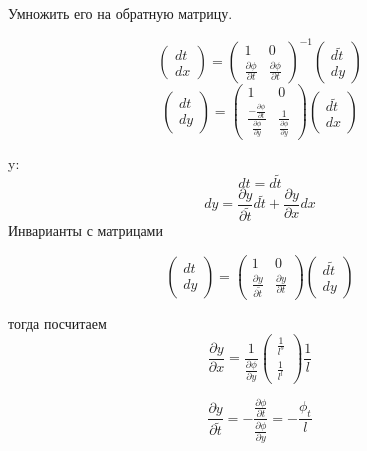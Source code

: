 \documentclass[12pt, a4paper]{article}
\begin{document}
Умножить его на обратную матрицу.

\[
\begin{pmatrix}
	d t \\
	d x
\end{pmatrix}
 =
\begin{pmatrix}
	1 & 0 \\
	\frac{\partial \phi}{\partial t} & \frac{\partial \phi}{\partial t}
\end{pmatrix}^{-1}
\begin{pmatrix}
	d \widetilde{t} \\
	dy
\end{pmatrix}
\]
\[
\begin{pmatrix}
	d t \\
	d y
\end{pmatrix}
 =
\begin{pmatrix}
	1 & 0 \\
	\frac{-\frac{\partial \phi}{\partial t}}{\frac{\partial \phi}{\partial y}} & \frac{1}{\frac{\partial \phi}{\partial y}}
\end{pmatrix}
\begin{pmatrix}
	d \widetilde{t} \\
	dx
\end{pmatrix}
\]

y:
\[ dt = d\widetilde{t} \]
\[ dy = \frac{\partial y}{\partial  \widetilde{t}} d \widetilde{t} + \frac{\partial y}{\partial x} dx \]
Инварианты с матрицами

\[
\begin{pmatrix}
	d t \\
	d y
\end{pmatrix}
 =
\begin{pmatrix}
	1 & 0 \\
	\frac{\partial y}{\partial \widetilde{t}} & \frac{\partial y}{\partial t}
\end{pmatrix}
\begin{pmatrix}
	d \widetilde{t} \\
	dy
\end{pmatrix}
\]

тогда посчитаем
\[ \frac{\partial y}{\partial x} = \frac{1}{\frac{\partial \phi}{\partial y}} \begin{pmatrix}
	\frac{1}{l^s} \\
	\frac{1}{l^l}
\end{pmatrix}
\frac{1}{l}
\]

\[ \frac{\partial y}{\partial \widetilde{t}} = - \frac{\frac{\partial \phi}{\partial t}}{\frac{\partial \phi}{\partial y}} = - \frac{\phi_t}{l} \]
\end{document}
